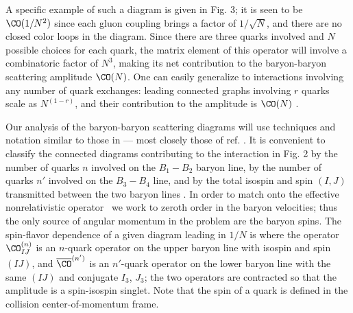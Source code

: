 %
\topinsert
\centerline{\epsfxsize=2.5in}
\smallskip
\caption{Fig. 3.  A connected diagram that is $\CO(1/N^2)$ involving a 1-body
operator between $\bra{B_1}$ and $\ket{B_2}$, and a 2-body operator between
$\bra{B_3}$ and $\ket{B_4}$.}
\endinsert
%
 A specific example of such a diagram is given in Fig. 3; it is seen to be
$\CO(1/N^2)$ since each gluon coupling brings a factor of $1/\sqrt{N}$, and
there are no closed color loops in the diagram.  Since there are three quarks
involved and $N$ possible choices for each quark, the matrix element of this
operator will involve a combinatoric factor of $N^3$, making its net
contribution to the baryon-baryon scattering amplitude  $\CO(N)$.  One can
easily generalize to interactions involving any number of quark exchanges:
leading connected graphs involving $r$ quarks scale as $N^{(1-r)}$, and their
contribution to the amplitude is $\CO(N)$ \witten.

Our analysis of the baryon-baryon scattering diagrams will use techniques
and notation similar to  those in  --- most closely those of
ref. \djmii. It
is convenient to classify the connected diagrams contributing to the
interaction in Fig. 2 by the number of quarks $n$ involved on the $B_1-B_2$
baryon line, by the number of quarks $n'$ involved on the $B_3-B_4$ line, and
by
the total isospin and spin $(I,J)$ transmitted between the two baryon lines
. In order to match onto the effective nonrelativistic
operator \suivop\ we work to zeroth order in the baryon velocities; thus the
only source of angular momentum in the problem are the baryon spins.  The
spin-flavor dependence of a given diagram leading in $1/N$ is
 \eqn{}
where the operator $\CO^{(n)}_{IJ}$ is an $n$-quark operator on the upper
baryon line with isospin and spin $(IJ)$, and $\bar\CO^{(n')}$ is an $n'$-quark
operator on the lower baryon line with the same $(IJ)$ and conjugate $I_3$,
$J_3$; the two operators are contracted so that the amplitude is a spin-isospin
singlet. Note that the spin of a quark is defined in the collision
center-of-momentum frame.

